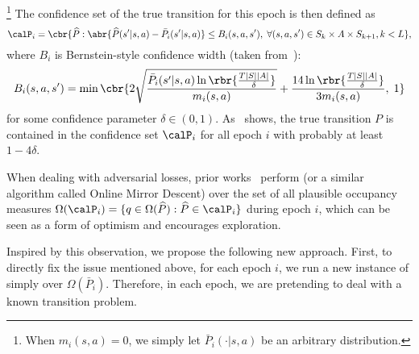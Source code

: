 \footnote{When $m_i(s,a) = 0$, we simply let $\bar{P}_i(\cdot|s,a)$ be an arbitrary distribution.}
The confidence set of the true transition for this epoch is then defined as
\begin{equation*}
\calP_i = \cbr{ \widehat{P}: \abr{ \widehat{P}(s'|s,a) - \bar{P}_i(s'|s,a) } \leq B_i(s,a,s'), \; \forall (s,a,s')\in S_k \times A \times S_{k+1}, k < L },
\end{equation*} 
where $B_i$ is Bernstein-style confidence width (taken from~\cite{jin2019learning}):
\begin{equation}
\label{eq:confidence_width_def} 
B_i(s,a,s') = \min\cbr{  2 \sqrt{\frac{\bar{P}_i(s'|s,a)\ln \rbr{\frac{T|S||A|}{\delta}}}{m_{i}(s,a)}} + \frac{14\ln\rbr{\frac{T|S||A|}{\delta}}}{3m_{i}(s,a)}, \; 1}
\end{equation}
for some confidence parameter $\delta \in (0,1)$.
As~\citep[Lemma~2]{jin2019learning} shows, the true transition $P$ is contained in the confidence set $\calP_i$ for all epoch $i$ with probably at least $1-4\delta$.

When dealing with adversarial losses, prior works~\citep{rosenberg19a, rosenberg2019online, jin2019learning, lee2020bias} perform \ftrl (or a similar algorithm called Online Mirror Descent) over the set of all plausible occupancy measures $\Omega(\calP_i) = \{q \in \Omega(\widehat{P}): \widehat{P} \in \calP_i\}$ during epoch $i$, which can be seen as a form of optimism and encourages exploration.

Inspired by this observation, we propose the following new approach.
First, to directly fix the issue mentioned above, for each epoch $i$, we run a new instance of \ftrl simply over $\Omega(\bar{P}_i)$.
Therefore, in each epoch, we are pretending to deal with a known transition problem. %


